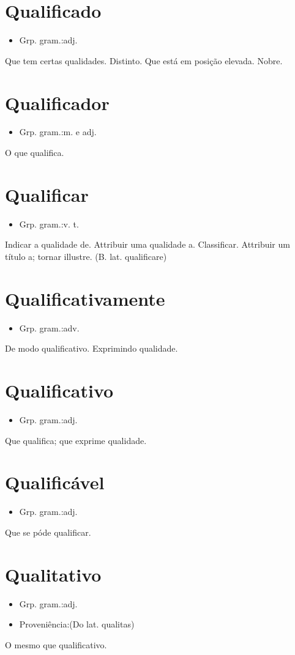 \section{Qualificado}
\begin{itemize}
\item {Grp. gram.:adj.}
\end{itemize}
Que tem certas qualidades.
Distinto.
Que está em posição elevada.
Nobre.
\section{Qualificador}
\begin{itemize}
\item {Grp. gram.:m.  e  adj.}
\end{itemize}
O que qualifica.
\section{Qualificar}
\begin{itemize}
\item {Grp. gram.:v. t.}
\end{itemize}
Indicar a qualidade de.
Attribuir uma qualidade a.
Classificar.
Attribuir um título a; tornar illustre.
(B. lat. \textunderscore qualificare\textunderscore )
\section{Qualificativamente}
\begin{itemize}
\item {Grp. gram.:adv.}
\end{itemize}
De modo qualificativo.
Exprimindo qualidade.
\section{Qualificativo}
\begin{itemize}
\item {Grp. gram.:adj.}
\end{itemize}
Que qualifica; que exprime qualidade.
\section{Qualificável}
\begin{itemize}
\item {Grp. gram.:adj.}
\end{itemize}
Que se póde qualificar.
\section{Qualitativo}
\begin{itemize}
\item {Grp. gram.:adj.}
\end{itemize}
\begin{itemize}
\item {Proveniência:(Do lat. \textunderscore qualitas\textunderscore )}
\end{itemize}
O mesmo que \textunderscore qualificativo\textunderscore .

